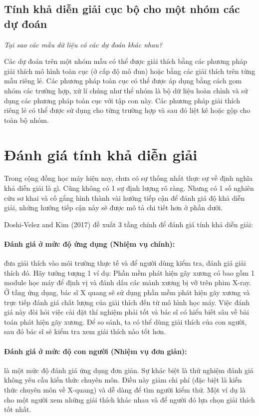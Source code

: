 \subsection{Tính khả diễn giải cục bộ cho một nhóm các dự đoán}
\textit{Tại sao các mẫu dữ liệu có các dự đoán khác nhau?}

Các dự đoán trên một nhóm mẫu có thể được giải thích bằng các phương pháp giải thích mô hình toàn cục (ở cấp độ mô đun) hoặc bằng các giải thích trên từng mẫu riêng lẻ. Các phương pháp toàn cục có thể được áp dụng bằng cách gom nhóm các trường hợp, xử lí chúng như thể nhóm là bộ dữ liệu hoàn chỉnh và sử dụng các phương pháp toàn cục với tập con này. Các phương pháp giải thích riêng lẻ có thể được sử dụng cho từng trường hợp và sau đó liệt kê hoặc gộp cho toàn bộ nhóm.

\clearpage

\section{Đánh giá tính khả diễn giải}

Trong cộng đồng học máy hiện nay, chưa có sự thống nhất thực sự về định nghĩa khả diễn giải là gì. Cũng không có 1 sự định lượng rõ ràng. Nhưng có 1 số nghiên cứu sơ khai và cố gắng hình thành vài hướng tiếp cận để đánh giá độ khả diễn giải, những hướng tiếp cận này sẽ được mô tả chi tiết hơn ở phần dưới.

Doshi-Velez and Kim (2017) đề xuất 3 tầng chính để đánh giá tính khả diễn giải:

\paragraph{Đánh giá ở mức độ ứng dụng (Nhiệm vụ chính):} đưa giải thích vào môi trường thực tế và để người dùng kiểm tra, đánh giá giải thích đó. Hãy tưởng tượng 1 ví dụ: Phần mềm phát hiện gãy xương có bao gồm 1 module học máy để định vị và đánh dấu các mảnh xương bị vỡ trên phim X-ray. Ở tầng ứng dụng, bác sĩ X quang sẽ sử dụng phần mềm phát hiện gãy xương và trực tiếp đánh giá chất lượng của giải thích đến từ mô hình học máy. Việc đánh giá này đòi hỏi việc cài đặt thí nghiệm phải tốt và bác sĩ có hiểu biết sâu về bài toán phát hiện gãy xương. Để so sánh, ta có thể dùng giải thích của con người, sau đó bác sĩ sẽ kiểm tra xem giải thích nào tốt hơn.

\paragraph{Đánh giá ở mức độ con người (Nhiệm vụ đơn giản):} là một mức độ đánh giá ứng dụng đơn giản. Sự khác biệt là thử nghiệm đánh giá không yêu cầu kiến thức chuyên môn. Điều này giảm chi phí (đặc biệt là kiến thức chuyên môn về X-quang) và dễ dàng để tìm người kiểm thử. Một ví dụ là cho một người xem những giải thích khác nhau và để người đó lựa chọn giải thích tốt nhất.

